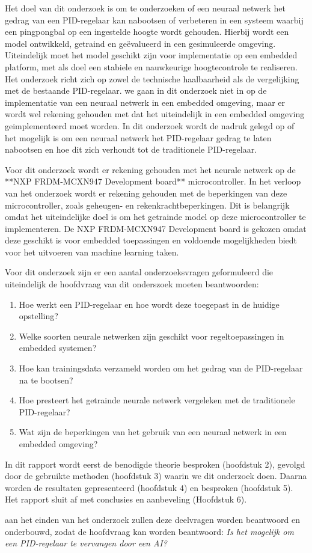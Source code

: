 Het doel van dit onderzoek is om te onderzoeken of een neuraal netwerk het gedrag van een PID-regelaar kan nabootsen of verbeteren in een systeem waarbij een pingpongbal op een ingestelde hoogte wordt gehouden. Hierbij wordt een model ontwikkeld, getraind en geëvalueerd in een gesimuleerde omgeving. Uiteindelijk moet het model geschikt zijn voor implementatie op een embedded platform, met als doel een stabiele en nauwkeurige hoogtecontrole te realiseren. Het onderzoek richt zich op zowel de technische haalbaarheid als de vergelijking met de bestaande PID-regelaar. we gaan in dit onderzoek niet in op de implementatie van een neuraal netwerk in een embedded omgeving, maar er wordt wel rekening gehouden met dat het uiteindelijk in een embedded omgeving geimplementeerd moet worden. In dit onderzoek wordt de nadruk gelegd op of het mogelijk is om een neuraal netwerk het PID-regelaar gedrag te laten nabootsen en hoe dit zich verhoudt tot de traditionele PID-regelaar.

Voor dit onderzoek wordt er rekening gehouden met het neurale netwerk op de **NXP FRDM-MCXN947 Development board** microcontroller. In het verloop van het onderzoek wordt er rekening gehouden met de beperkingen van deze microcontroller, zoals geheugen- en rekenkrachtbeperkingen. Dit is belangrijk omdat het uiteindelijke doel is om het getrainde model op deze microcontroller te implementeren. De NXP FRDM-MCXN947 Development board is gekozen omdat deze geschikt is voor embedded toepassingen en voldoende mogelijkheden biedt voor het uitvoeren van machine learning taken.

Voor dit onderzoek zijn er een aantal onderzoeksvragen geformuleerd die uiteindelijk de hoofdvraag van dit onderszoek moeten beantwoorden:
\begin{enumerate}
  \item Hoe werkt een PID-regelaar en hoe wordt deze toegepast in de huidige opstelling?
  \item Welke soorten neurale netwerken zijn geschikt voor regeltoepassingen in embedded systemen?
  \item Hoe kan trainingsdata verzameld worden om het gedrag van de PID-regelaar na te bootsen?
  \item Hoe presteert het getrainde neurale netwerk vergeleken met de traditionele PID-regelaar?
  \item Wat zijn de beperkingen van het gebruik van een neuraal netwerk in een embedded omgeving?
\end{enumerate}

In dit rapport wordt eerst de benodigde theorie besproken (hoofdstuk 2), gevolgd door de gebruikte methoden (hoofdstuk 3) waarin we dit onderzoek doen. Daarna worden de resultaten gepresenteerd (hoofdstuk 4) en besproken (hoofdstuk 5). Het rapport sluit af met conclusies en aanbeveling (Hoofdstuk 6).

aan het einden van het onderzoek zullen deze deelvragen worden beantwoord en onderbouwd, zodat de hoofdvraag kan worden beantwoord: \textit{Is het mogelijk om een PID-regelaar te vervangen door een AI?}

